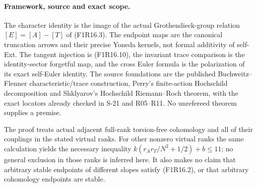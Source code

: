 \paragraph{Framework, source and exact scope.}
The character identity is the image of the actual
Grothendieck-group relation $[E]=[A]-[T]$ of
(F1R16.3). The endpoint maps are the canonical truncation
arrows and their precise Yoneda kernels, not formal
additivity of self-Ext. The tangent injection is
(F1R16.10), the invariant trace comparison is the
identity-sector forgetful map, and the cross Euler
formula is the polarization of its exact self-Euler
identity. The source foundations are the published
Buchweitz--Flenner characteristic/trace construction,
Perry's finite-action Hochschild decomposition and
Shklyarov's Hochschild Riemann--Roch theorem, with the
exact locators already checked in S-21 and R05--R11.
No unrefereed theorem supplies a premise.

The proof treats actual adjacent full-rank torsion-free
cohomology and all of their couplings in the stated
virtual ranks. For other nonzero virtual ranks the same
calculation yields the necessary inequality
$k(r_A r_T/N^2+1/2)+b\le11$; no general exclusion in
those ranks is inferred here. It also makes no claim
that arbitrary stable endpoints of different slopes
satisfy (F1R16.2), or that arbitrary cohomology endpoints
are stable.
